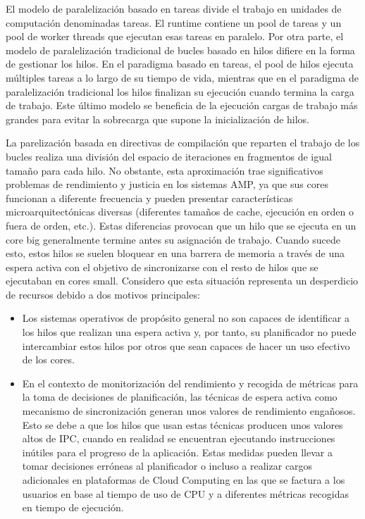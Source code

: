 El modelo de paralelización basado en tareas divide el trabajo en unidades de computación denominadas tareas. El runtime contiene un pool de tareas y un pool de worker threads que ejecutan esas tareas en paralelo. Por otra parte, el modelo de paralelización tradicional de bucles basado en hilos difiere en la forma de gestionar los hilos. En el paradigma basado en tareas, el pool de hilos ejecuta múltiples tareas a lo largo de su tiempo de vida, mientras que en el paradigma de paralelización tradicional los hilos finalizan su ejecución cuando termina la carga de trabajo. Este último modelo se beneficia de la ejecución cargas de trabajo más grandes para evitar la sobrecarga que supone la inicialización de hilos.

La parelización basada en directivas de compilación que reparten el trabajo de los bucles realiza una división del espacio de iteraciones en fragmentos de igual tamaño para cada hilo. No obstante, esta aproximación trae significativos problemas de rendimiento y justicia en los sistemas AMP, ya que sus cores funcionan a diferente frecuencia y pueden presentar características microarquitectónicas diversas (diferentes tamaños de cache, ejecución en orden o fuera de orden, etc.). Estas diferencias provocan que un hilo que se ejecuta en un core big generalmente termine antes su asignación de trabajo. Cuando sucede esto, estos hilos se suelen bloquear en una barrera de memoria a través de una espera activa con el objetivo de sincronizarse con el resto de hilos que se ejecutaban en cores small. Considero que esta situación representa un desperdicio de recursos debido a dos motivos principales:

\begin{itemize}
	\item Los sistemas operativos de propósito general no son capaces de identificar a los hilos que realizan una espera activa y, por tanto, su planificador no puede intercambiar estos hilos por otros que sean capaces de hacer un uso efectivo de los cores.
	\item En el contexto de monitorización del rendimiento y recogida de métricas para la toma de decisiones de planificación, las técnicas de espera activa como mecanismo de sincronización generan unos valores de rendimiento engañosos. Esto se debe a que los hilos que usan estas técnicas producen unos valores altos de IPC, cuando en realidad se encuentran ejecutando instrucciones inútiles para el progreso de la aplicación. Estas medidas pueden llevar a tomar decisiones erróneas al planificador o incluso a realizar cargos adicionales en plataformas de Cloud Computing en las que se factura a los usuarios en base al tiempo de uso de CPU y a diferentes métricas recogidas en tiempo de ejecución.
\end{itemize}


